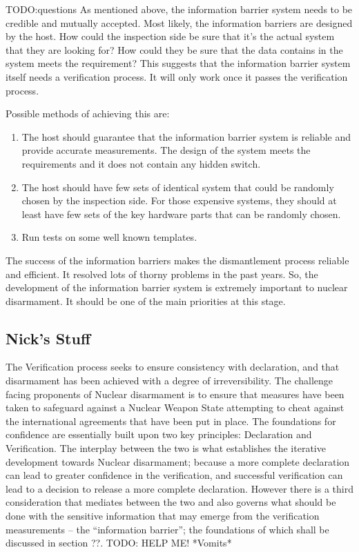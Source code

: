 \documentclass[twoside,titlepage,11pt,twocolumn,a4paper]{article}
\begin{document}
TODO:questions
As mentioned above, the information barrier system
needs to be credible and mutually accepted. Most likely, the
information barriers are designed by the host. How could the
inspection side be sure that it's the actual system that they are
looking for? How could they be sure that the data contains in the
system meets the requirement? This suggests that the information
barrier system itself needs a verification process. It will only work
once it passes the verification process.

Possible methods of achieving this are:
\begin{enumerate}
  \item The host should guarantee that the information barrier system
    is reliable and provide accurate measurements. The design of the
    system meets the requirements and it does not contain any hidden
    switch.
  \item The host should have few sets of identical system that could
    be randomly chosen by the inspection side. For those expensive
    systems, they should at least have few sets of the key hardware
    parts that can be randomly chosen.
  \item Run tests on some well known templates.
\end{enumerate}

The success of the information barriers makes the dismantlement
process reliable and efficient. It resolved lots of thorny problems in
the past years. So, the development of the information barrier system
is extremely important to nuclear disarmament. It should be one of the
main priorities at this stage.

\subsection{Nick's Stuff}
The Verification process seeks to ensure consistency with declaration,
and that disarmament has been achieved with a degree of
irreversibility.  The challenge facing proponents of Nuclear
disarmament is to ensure that measures have been taken to safeguard
against a Nuclear Weapon State attempting to cheat against the
international agreements that have been put in place. The foundations
for confidence are essentially built upon two key principles:
Declaration and Verification. The interplay between the two is what
establishes the iterative development towards Nuclear disarmament;
because a more complete declaration can lead to greater confidence in
the verification, and successful verification can lead to a decision
to release a more complete declaration. However there is a third
consideration that mediates between the two and also governs what
should be done with the sensitive information that may emerge from the
verification measurements -- the ``information barrier''; the
foundations of which shall be discussed in section ??.
TODO: HELP ME! *Vomits*
\end{document}
